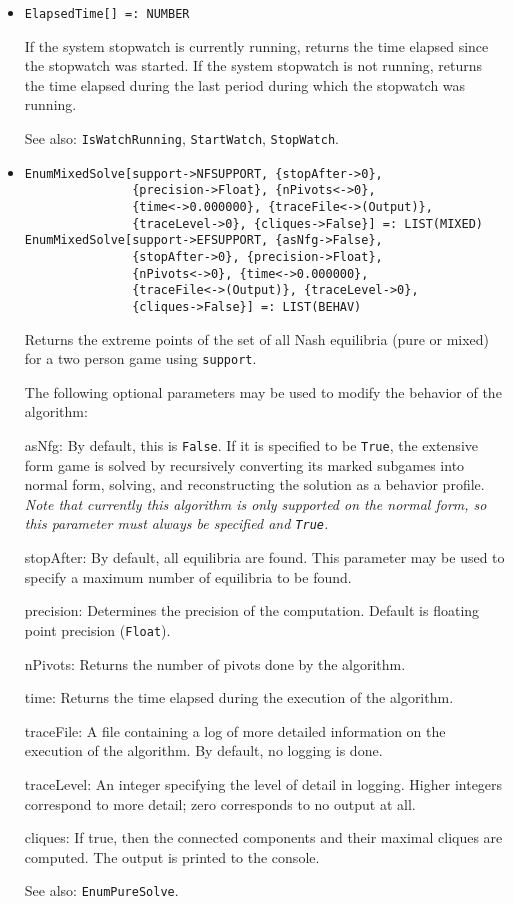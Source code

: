 \begin{itemize}

\item{}
\protect \large \begin{verbatim}
ElapsedTime[] =: NUMBER 
\end{verbatim}\normalsize

\bd
If the system stopwatch is currently running, returns the
time elapsed since the stopwatch was started.  If the system stopwatch
is not running, returns the time elapsed during the last period during which
the stopwatch was running.
\item
[See also:] \verb+IsWatchRunning+, \verb+StartWatch+, \verb+StopWatch+.
\ed

\item{}
\protect \large \begin{verbatim}
EnumMixedSolve[support->NFSUPPORT, {stopAfter->0}, 
               {precision->Float}, {nPivots<->0}, 
               {time<->0.000000}, {traceFile<->(Output)}, 
               {traceLevel->0}, {cliques->False}] =: LIST(MIXED) 
EnumMixedSolve[support->EFSUPPORT, {asNfg->False}, 
               {stopAfter->0}, {precision->Float}, 
               {nPivots<->0}, {time<->0.000000}, 
               {traceFile<->(Output)}, {traceLevel->0},
               {cliques->False}] =: LIST(BEHAV) 
\end{verbatim}\normalsize
\bd
Returns the extreme points of the set of all Nash equilibria (pure or
mixed) for a two person game using \verb+support+.

The following optional parameters may be used to modify the behavior
of the algorithm:
\bd
\item
[asNfg:] By default, this is \verb+False+.  If it is specified to be
\verb+True+, the extensive form game is solved by recursively converting
its marked subgames into normal form, solving, and reconstructing the
solution as a behavior profile.  {\it Note that currently this algorithm
is only supported on the normal form, so this parameter
must always be specified and {\tt True}.} 
\item
[stopAfter:] By default, all equilibria are found.  This parameter may
be used to specify a maximum number of equilibria to be found.
\item
[precision:] Determines the precision of the computation. Default is
floating point precision (\verb+Float+). 
\item
[nPivots:] Returns the number of pivots done by the
algorithm.
\item
[time:] Returns the time elapsed during the execution
of the algorithm.
\item
[traceFile:] A file containing a log of more detailed information on the
execution of the algorithm.  By default, no logging is done.
\item
[traceLevel:] An integer specifying the level of detail in logging.
Higher integers correspond to more detail; zero corresponds to no output
at all.
\item
[cliques:] If true, then the connected components and their maximal
cliques are computed.  The output is printed to the console.
\ed
\item [See also:] \verb+EnumPureSolve+.
\ed


\end{itemize}
